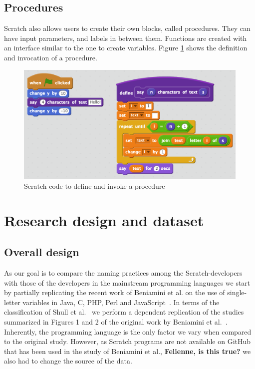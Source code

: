 \documentclass[conference]{IEEEtran}
\newcommand{\todo}[1]{ \textbf{#1} }
\begin{document}
\subsection{Procedures} \label {sec:scratch_func}
Scratch also allows users to create their own blocks, called procedures. They can have input parameters, and labels in between them. Functions are created with an interface similar to the one to create variables. Figure \ref{fig:functions} shows the definition and invocation of a procedure.

\begin{figure}
  \begin{center}
  \includegraphics[width=\columnwidth]{fig/functions2.png}
  \caption{Scratch code to define and invoke a procedure}
  \label{fig:functions}
  \end{center}
\end{figure} 


\section{Research design and dataset}
\subsection{Overall design}
As our goal is to compare the naming practices among the Scratch-developers with those of the developers in the mainstream programming languages we start by partially replicating the recent work of Beniamini et al. on the use of single-letter variables in Java, C, PHP, Perl and JavaScript~\cite{Beniamini}. 
In terms of the classification of Shull et al.~\cite{Shull2008} we perform a dependent replication of the studies summarized in Figures 1 and 2 of the original work by Beniamini et al.~\cite{Beniamini}.  
 Inherently, the programming language is the only factor we vary when compared to the original study.
However, as Scratch programs are not available on GitHub that has been used in the study of Beniamini et al., \todo{Felienne, is this true?} we also had to change the source of the data.
\end{document}
